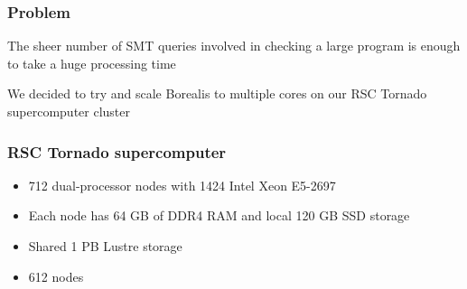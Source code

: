 
\begin{frame}
\frametitle{Problem}
\begin{block}{}
	\centering
	The sheer number of SMT queries involved in checking a large program is enough to take a huge processing time
\end{block}


\begin{block}{}
	\centering
	We decided to try and scale Borealis to multiple cores on our RSC Tornado supercomputer cluster
\end{block}
\end{frame}


\begin{frame}
\frametitle{RSC Tornado supercomputer}
\begin{itemize}
\item 712 dual-processor nodes with 1424 Intel Xeon E5-2697
\item Each node has 64 GB of DDR4 RAM and local 120 GB SSD storage
\item Shared 1 PB Lustre storage
\item 612 nodes
\end{itemize}
\end{frame}

